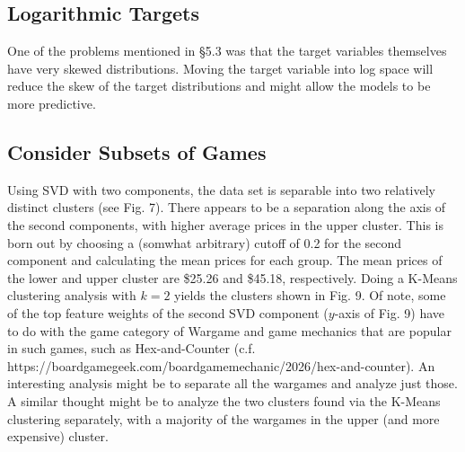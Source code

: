 \documentclass[12pt]{article}
\begin{document}
\subsection{Logarithmic Targets}
One of the problems mentioned in \S5.3 was that the target variables themselves have very skewed distributions. Moving the target variable into log space will reduce the skew of the target distributions and might allow the models to be more predictive.

\subsection{Consider Subsets of Games}
Using SVD with two components, the data set is separable into two relatively distinct clusters (see Fig. 7). There appears to be a separation along the axis of the second components, with higher average prices in the upper cluster. This is born out by choosing a (somwhat arbitrary) cutoff of 0.2 for the second component and calculating the mean prices for each group. The mean prices of the lower and upper cluster are \$25.26 and \$45.18, respectively. Doing a K-Means clustering analysis with $k=2$ yields the clusters shown in Fig. 9. Of note, some of the top feature weights of the second SVD component ($y$-axis of Fig. 9) have to do with the game category of Wargame and game mechanics that are popular in such games, such as Hex-and-Counter (c.f. https://boardgamegeek.com/boardgamemechanic/2026/hex-and-counter). An interesting analysis might be to separate all the wargames and analyze just those. A similar thought might be to analyze the two clusters found via the K-Means clustering separately, with a majority of the wargames in the upper (and more expensive) cluster. 
\end{document}
